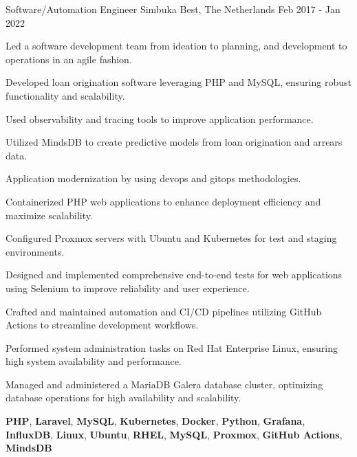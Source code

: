 \begin{cventries}
  \cventry
    {Software/Automation Engineer} %
    {Simbuka} %
    {Best, The Netherlands} %
    {Feb 2017 - Jan 2022} %
    {
      \begin{cvitems} %
        \item {Led a software development team from ideation to planning, and development to operations in an agile fashion.}
        \item {Developed loan origination software leveraging PHP and MySQL, ensuring robust functionality and scalability.}
        \item {Used observability and tracing tools to improve application performance.}
        \item {Utilized MindsDB to create predictive models from loan origination and arrears data.}
        \item {Application modernization by using devops and gitops methodologies.}
        \item {Containerized PHP web applications to enhance deployment efficiency and maximize scalability.}
        \item {Configured Proxmox servers with Ubuntu and Kubernetes for test and staging environments.}
        \item {Designed and implemented comprehensive end-to-end tests for web applications using Selenium to improve reliability and user experience.}
        \item {Crafted and maintained automation and CI/CD pipelines utilizing GitHub Actions to streamline development workflows.}
        \item {Performed system administration tasks on Red Hat Enterprise Linux, ensuring high system availability and performance.}
        \item {Managed and administered a MariaDB Galera database cluster, optimizing database operations for high availability and scalability.}
      \end{cvitems}
    }
    {\textbf{PHP}, \textbf{Laravel}, \textbf{MySQL}, \textbf{Kubernetes}, \textbf{Docker}, \textbf{Python}, \textbf{Grafana}, \textbf{InfluxDB}, \textbf{Linux}, \textbf{Ubuntu}, \textbf{RHEL}, \textbf{MySQL}, \textbf{Proxmox}, \textbf{GitHub Actions}, \textbf{MindsDB}}

\newpage


\end{cventries}
